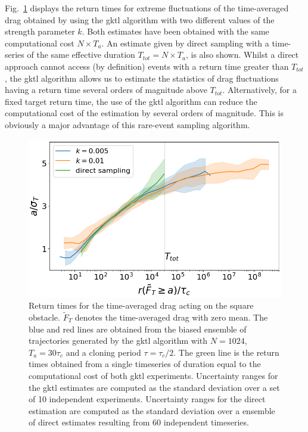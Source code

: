 \documentclass{jfm}
\newcommand{\EL}[1]{{\color{myred}{#1}}}
\begin{document}
%

Fig.~\ref{fig:return_times_gktl} displays the return times for extreme fluctuations of the time-averaged drag obtained by using the \ac{gktl} algorithm with two different values of the strength parameter $k$.  
%
Both estimates have been obtained with the same computational cost $N\times T_a$.
An estimate given by direct sampling with a time-series of the same effective duration $T_{tot}=N\times T_a$, is also shown. 
Whilst a direct approach cannot access (by definition) events with a return time greater than $T_{tot}$, the \ac{gktl} algorithm allows us to estimate the statistics of drag fluctuations having a return time several orders of magnitude above $T_{tot}$. Alternatively, for a fixed target return time, the use of the \ac{gktl} algorithm can reduce the computational cost of the estimation by several orders of magnitude. This is  obviously a major advantage of this rare-event sampling algorithm. 
%

\begin{figure}
	\centering
	\includegraphics[width=.7\linewidth]{return_times_GKTL/return_times_GKTL}
	\caption{\label{fig:return_times_gktl} Return times for the time-averaged drag acting on the square obstacle. $\tilde{F}_T$ denotes the time-averaged drag with zero mean. The blue and red lines are obtained from the biased ensemble of trajectories generated by the \ac{gktl} algorithm with $N=1024$, $T_a=30\tau_c$ and a cloning period $\tau=\tau_c/2$. The green line is the return times obtained from a single timeseries of duration equal to the computational cost of both \ac{gktl} experiments. Uncertainty ranges for the \ac{gktl} estimates are computed as the standard deviation over a set of 10 independent experiments. Uncertainty ranges for the direct estimation are computed as the standard deviation over a ensemble of direct estimates resulting from 60 independent timeseries.}
\end{figure}
\end{document}
